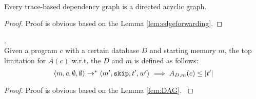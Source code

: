\documentclass[a4paper,11pt]{article}
\begin{document}
%
\begin{lem}
\label{lem:DAG}
\\
%
{
Every trace-based dependency graph is a directed acyclic graph.
}
\end{lem}
%
{
\begin{proof}
Proof is obvious based on the Lemma \ref{lem:edgeforwarding}.
\end{proof}
}
%
\begin{lem}
.
\\
{
Given a program $c$ with a certain database $D$ and starting memory $m$,
the top limitation for $A(c)$ w.r.t. the $D$ and $m$ is defined as follows:
%
\[
\langle m, c, \emptyset, \emptyset \rangle 
\rightarrow^{*} 
\langle m', \mathtt{skip}, t', w' \rangle 
\implies
A_{D, m}(c) \leq |t'|
\]
}
\end{lem}
%
\begin{proof}
{
Proof is obvious based on the Lemma \ref{lem:DAG}.
}
\end{proof}
%
%
\clearpage
\end{document}
